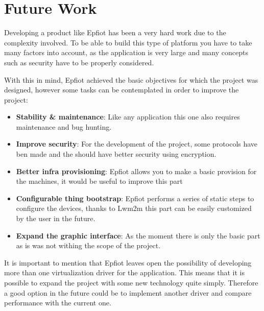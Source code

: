 \newpage
\section{Future Work}
\label{makereference7.2}

Developing a product like Epfiot has been a very hard work due to the complexity involved. To be able to build this type of platform you have to take many factors into account, as the application is very large and many concepts such as security have to be properly considered.

With this in mind, Epfiot achieved the basic objectives for which the project was designed, however some tasks can be contemplated in order to improve the project:

\begin{itemize}
    \item \textbf{Stability \& maintenance}: Like any application this one also requires maintenance and bug hunting.
    \item \textbf{Improve security}: For the development of the project, some protocols have ben made and the should have better security using encryption.
    \item \textbf{Better infra provisioning}: Epfiot allows you to make a basic provision for the machines, it would be useful to improve this part
    \item \textbf{Configurable thing bootstrap}: Epfiot performs a series of static steps to configure the devices, thanks to Lwm2m this part can be easily customized by the user in the future.
    \item \textbf{Expand the graphic interface}: As the moment there is only the basic part as is was not withing the scope of the project.
\end{itemize}

It is important to mention that Epfiot leaves open the possibility of developing more than one virtualization driver for the application. This means that it is possible to expand the project with some new technology quite simply. Therefore a good option in the future could be to implement another driver and compare performance with the current one.

